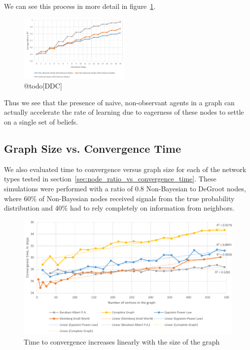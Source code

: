 \documentclass[letterpaper, 10pt, conference]{ieeeconf}
\begin{document}
We can see this process in more detail in figure~\ref{fig:dg_faster}.

\begin{figure}[th]
\centering
\includegraphics[width=0.48\textwidth]{figures/dg_faster}
\caption{@todo[DDC]}
\label{fig:dg_faster}
\end{figure}

Thus we see that the presence of naive, non-observant agents in a graph can actually accelerate the rate of learning due to eagerness of these nodes to settle on a single set of beliefs.

\subsection{Graph Size vs. Convergence Time}

We also evaluated time to convergence versus graph size for each of the network types tested in section~\ref{sec:node_ratio_vs_convergence_time}.  These simulations were performed with a ratio of 0.8 Non-Bayesian to DeGroot nodes, where 60\% of Non-Bayesian nodes received signals from the true probability distribution and 40\% had to rely completely on information from neighbors.

\begin{figure}[h]
\centering
\includegraphics[width=.9\textwidth]{figures/convergence_time}
\caption{Time to convergence increases linearly with the size of the graph}
\label{fig:convergence_time}
\end{figure}
\end{document}
